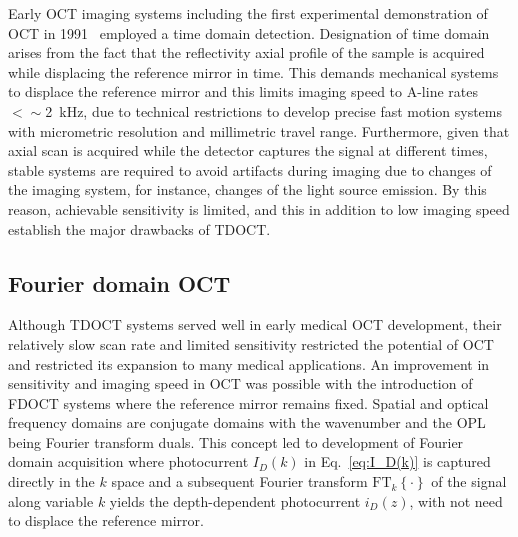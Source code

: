 Early OCT imaging systems including the first experimental demonstration of OCT in 1991~\cite{} employed a time domain detection. Designation of time domain arises from the fact that the reflectivity axial profile of the sample is acquired while displacing the reference mirror in time. This demands mechanical systems to displace the reference mirror and this limits imaging speed to A-line rates $<\sim$2~kHz, due to technical restrictions to develop precise fast motion systems with micrometric resolution and millimetric travel range. Furthermore, given that axial scan is acquired while the detector captures the signal at different times, stable systems are required to avoid artifacts during imaging due to changes of the imaging system, for instance, changes of the light source emission. By this reason, achievable sensitivity is limited, and this in addition to low imaging speed establish the major drawbacks of TDOCT.

\subsection{Fourier domain OCT}

Although TDOCT systems served well in early medical OCT development, their relatively slow scan rate and limited sensitivity restricted the potential of OCT and restricted its expansion to many medical applications. An improvement in sensitivity and imaging speed in OCT was possible with the introduction of FDOCT systems where the reference mirror remains fixed. Spatial and optical frequency domains are conjugate domains with the wavenumber and the OPL being Fourier transform duals. This concept led to development of Fourier domain acquisition where photocurrent $I_D(k)$ in Eq.~\eqref{eq:I_D(k)} is captured directly in the $k$ space and a subsequent Fourier transform $\text{FT}_k\left\{\cdot\right\}$ of the signal  along variable $k$ yields the depth-dependent photocurrent $i_D(z)$, with not need to displace the reference mirror.

